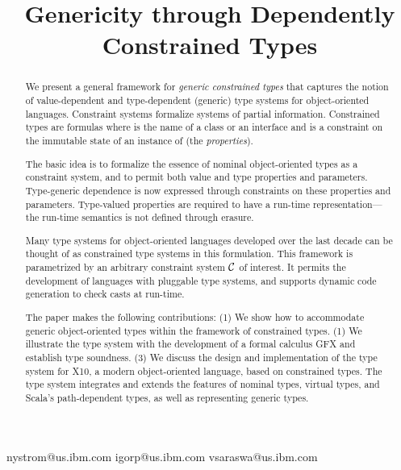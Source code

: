 \documentclass[preprint,nocopyrightspace,9pt]{sigplanconf}
\newif\iflncs
\newcommand\gxx{GFX\xspace}
\begin{document}
\title{Genericity through Dependently Constrained Types}

\iflncs

\author{
Nathaniel Nystrom\inst{1}
\and
Igor Peshansky\inst{1}
\and
Vijay Saraswat\inst{1}
}

\institute{IBM T.~J. Watson Research~Center,
P.O.~Box~704, Yorktown~Heights NY 10598 USA,
\email{\{nystrom,igorp,vsaraswa\}@us.ibm.com}}

\else

  {nystrom@us.ibm.com}
  {igorp@us.ibm.com}
  {vsaraswa@us.ibm.com}


\fi

\maketitle

\begin{abstract}
We present a general framework for \emph{generic constrained types}
that captures the notion of value-dependent and
type-dependent (generic) type systems for object-oriented
languages.  Constraint systems formalize systems of partial
information.  Constrained types are formulas  where
 is the name of a class or an interface and  is a
constraint on the immutable state of an instance of  (the
{\em properties}).

The basic idea is to formalize the essence of nominal
object-oriented types as a constraint system, and to permit both
value and type properties and parameters.  Type-generic
dependence is now expressed through constraints on these
properties and parameters.  Type-valued properties are required
to have a run-time representation---the run-time semantics is
not defined through erasure.

Many type systems for object-oriented languages developed over
the last decade can be thought of as constrained type systems in
this formulation.  This framework is parametrized by an
arbitrary constraint system $\cal C$ of interest.  It permits
the development of languages with pluggable type systems, and
supports dynamic code generation to check casts at run-time.

The paper makes the following contributions: (1) We show how to
accommodate generic object-oriented types within the framework of
constrained types. (1) We illustrate the type system with the
development of a formal calculus \gxx and establish type
soundness. (3) We discuss the design and implementation of the
type system for X10, a modern object-oriented language, based on
constrained types.  The type system integrates and extends the
features of nominal types, virtual types, and
Scala's path-dependent types, as well as representing generic
types.
\end{abstract}
\end{document}
